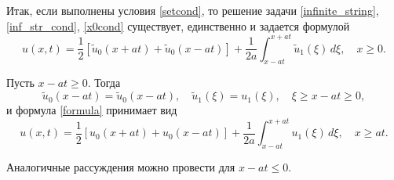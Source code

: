 Итак, если выполнены условия \eqref{setcond}, то решение задачи \eqref{infinite_string}, \eqref{inf_str_cond}, \eqref{x0cond} существует, единственно и задается формулой 
\begin{equation} \label{formula}
	u(x, t) = \frac{1}{2} [\tilde{u}_0(x + a t) + \tilde{u}_0(x - a t)] + \frac{1}{2 a} \int_{x - a t}^{x + a t} \tilde{u}_1(\xi) \, d\xi, \quad x \geqslant 0.
\end{equation}

Пусть $x - a t \geqslant 0$. Тогда
\begin{equation}
	\tilde{u}_0(x - a t) = \tilde{u}_0(x - a t), \quad \tilde{u}_1(\xi) = u_1(\xi), \quad \xi \geqslant x - a t \geqslant 0,
\end{equation}
и формула \eqref{formula} принимает вид 
\begin{equation}
	u(x, t) = \frac{1}{2} [u_0(x + a t) + u_0(x - a t)] + \frac{1}{2 a} \int_{x - a t}^{x + a t} u_1(\xi) \, d\xi, \quad x \geqslant at.
\end{equation}

Аналогичные рассуждения можно провести для $x - a t \leqslant 0$. 
